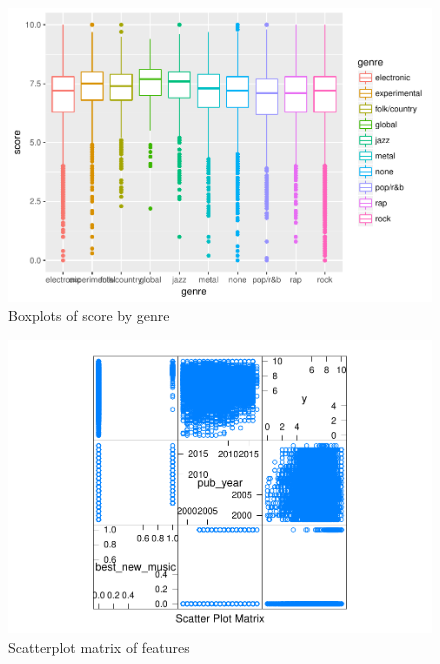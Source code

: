 \documentclass{article}
\begin{document}
\newpage

\newpage

\begin{figure}
\centering
\includegraphics{report_files/figure-latex/score_genre.pdf}
\caption{Boxplots of score by genre \label{fig2}}
\end{figure}

\newpage

\begin{figure}
\centering
\includegraphics{report_files/figure-latex/scatterplot_matrix.pdf}
\caption{Scatterplot matrix of features \label{fig3}}
\end{figure}

\newpage



\end{document}
